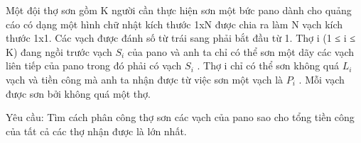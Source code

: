 Một đội thợ sơn gồm K người cần thực hiện sơn một bức pano dành cho quảng cáo có dạng một hình chữ nhật kích thước 1xN được chia ra làm N vạch kích thước 1x1. Các vạch được đánh số từ trái   sang phải bắt đầu từ 1. Thợ i (1 ≤ i ≤ K) đang ngồi trước vạch $S_{i}$   của pano và anh ta chỉ có thể sơn một dãy các vạch liên tiếp của pano trong đó phải có vạch $S_{i}$   . Thợ i chỉ có thể   sơn không quá $L_{i}$   vạch và tiền công mà anh ta nhận được từ việc sơn một vạch là $P_{i}$   . Mỗi vạch được sơn bởi không quá một thợ.  

   Yêu cầu: Tìm cách phân công thợ sơn các vạch của pano sao cho tổng tiền công của tất cả các thợ nhận được là lớn nhất.